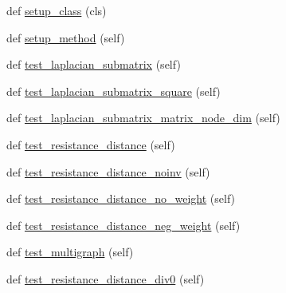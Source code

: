 \begin{DoxyCompactItemize}
\item 
def \hyperlink{classnetworkx_1_1algorithms_1_1tests_1_1test__distance__measures_1_1TestResistanceDistance_a94f801325a51bf38d62a66271a718beb}{setup\+\_\+class} (cls)
\item 
def \hyperlink{classnetworkx_1_1algorithms_1_1tests_1_1test__distance__measures_1_1TestResistanceDistance_ad503475058c1bb0595ef131b65f5c553}{setup\+\_\+method} (self)
\item 
def \hyperlink{classnetworkx_1_1algorithms_1_1tests_1_1test__distance__measures_1_1TestResistanceDistance_af637fae4cb89bce343874d45f7673daa}{test\+\_\+laplacian\+\_\+submatrix} (self)
\item 
def \hyperlink{classnetworkx_1_1algorithms_1_1tests_1_1test__distance__measures_1_1TestResistanceDistance_a710b89054e32027a07967e84857a2f6b}{test\+\_\+laplacian\+\_\+submatrix\+\_\+square} (self)
\item 
def \hyperlink{classnetworkx_1_1algorithms_1_1tests_1_1test__distance__measures_1_1TestResistanceDistance_ae3b73644a660af57ede0e3f718cbe5b7}{test\+\_\+laplacian\+\_\+submatrix\+\_\+matrix\+\_\+node\+\_\+dim} (self)
\item 
def \hyperlink{classnetworkx_1_1algorithms_1_1tests_1_1test__distance__measures_1_1TestResistanceDistance_aa5b630260c029c3dc791bdfc138c5428}{test\+\_\+resistance\+\_\+distance} (self)
\item 
def \hyperlink{classnetworkx_1_1algorithms_1_1tests_1_1test__distance__measures_1_1TestResistanceDistance_a938d8dbc4ea0b6aef167c366a80441b6}{test\+\_\+resistance\+\_\+distance\+\_\+noinv} (self)
\item 
def \hyperlink{classnetworkx_1_1algorithms_1_1tests_1_1test__distance__measures_1_1TestResistanceDistance_a88978fe1674155d5010866b06085a10a}{test\+\_\+resistance\+\_\+distance\+\_\+no\+\_\+weight} (self)
\item 
def \hyperlink{classnetworkx_1_1algorithms_1_1tests_1_1test__distance__measures_1_1TestResistanceDistance_aaf9b0eadaece2dd3617dfed69fbbd1e6}{test\+\_\+resistance\+\_\+distance\+\_\+neg\+\_\+weight} (self)
\item 
def \hyperlink{classnetworkx_1_1algorithms_1_1tests_1_1test__distance__measures_1_1TestResistanceDistance_a0a6284b8dfd79d93dc0dd26c643fe309}{test\+\_\+multigraph} (self)
\item 
def \hyperlink{classnetworkx_1_1algorithms_1_1tests_1_1test__distance__measures_1_1TestResistanceDistance_a89ac50c8445aaf48979ee2f91893e180}{test\+\_\+resistance\+\_\+distance\+\_\+div0} (self)

\end{DoxyCompactItemize}
